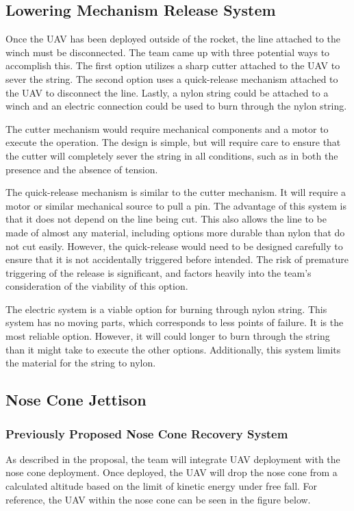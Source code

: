 	\subsection{Lowering Mechanism Release System}
		Once the UAV has been deployed outside of the rocket, the line attached to the winch must be disconnected. The team came up with three potential ways to accomplish this. The first option utilizes a sharp cutter attached to the UAV to sever the string. The second option uses a quick-release mechanism attached to the UAV to disconnect the line. Lastly, a nylon string could be attached to a winch and an electric connection could be used to burn through the nylon string. 

		The cutter mechanism would require mechanical components and a motor to execute the operation. The design is simple, but will require care to ensure that the cutter will completely sever the string in all conditions, such as in both the presence and the absence of tension. 
	
		The quick-release mechanism is similar to the cutter mechanism. It will require a motor or similar mechanical source to pull a pin. The advantage of this system is that it does not depend on the line being cut. This also allows the line to be made of almost any material, including options more durable than nylon that do not cut easily. However, the quick-release would need to be designed carefully to ensure that it is not accidentally triggered before intended. The risk of premature triggering of the release is significant, and factors heavily into the team’s consideration of the viability of this option. 
	
		The electric system is a viable option for burning through nylon string. This system has no moving parts, which corresponds to less points of failure. It is the most reliable option. However, it will could longer to burn through the string than it might take to execute the other options. Additionally, this system limits the material for the string to nylon. 
	

	\subsection{Nose Cone Jettison}
		\subsubsection{Previously Proposed Nose Cone Recovery System}
            As described in the proposal, the team will integrate UAV deployment with the nose cone deployment. Once deployed, the UAV will drop the nose cone from a calculated altitude based on the limit of kinetic energy under free fall. For reference, the UAV within the nose cone can be seen in the figure below.

